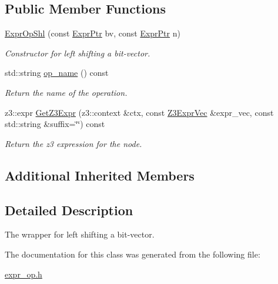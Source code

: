 \subsection*{Public Member Functions}
\begin{DoxyCompactItemize}
\item 
\mbox{\label{classilang_1_1_expr_op_shl_a85a0e2552bc2f503a9d3c6f4aadc6f0b}} 
\mbox{\hyperlink{classilang_1_1_expr_op_shl_a85a0e2552bc2f503a9d3c6f4aadc6f0b}{Expr\+Op\+Shl}} (const \mbox{\hyperlink{classilang_1_1_expr_a85952b6a34620c4c8cab6bac9c9fdf8c}{Expr\+Ptr}} bv, const \mbox{\hyperlink{classilang_1_1_expr_a85952b6a34620c4c8cab6bac9c9fdf8c}{Expr\+Ptr}} n)
\begin{DoxyCompactList}\small\item\em Constructor for left shifting a bit-\/vector. \end{DoxyCompactList}\item 
\mbox{\label{classilang_1_1_expr_op_shl_a8ddad9339c3165439b415035906368b8}} 
std\+::string \mbox{\hyperlink{classilang_1_1_expr_op_shl_a8ddad9339c3165439b415035906368b8}{op\+\_\+name}} () const
\begin{DoxyCompactList}\small\item\em Return the name of the operation. \end{DoxyCompactList}\item 
\mbox{\label{classilang_1_1_expr_op_shl_a297b2bc3b268ad05f31992154c806c72}} 
z3\+::expr \mbox{\hyperlink{classilang_1_1_expr_op_shl_a297b2bc3b268ad05f31992154c806c72}{Get\+Z3\+Expr}} (z3\+::context \&ctx, const \mbox{\hyperlink{namespaceilang_adc4eee919aa24fff882d03a48d733c19}{Z3\+Expr\+Vec}} \&expr\+\_\+vec, const std\+::string \&suffix=\char`\"{}\char`\"{}) const
\begin{DoxyCompactList}\small\item\em Return the z3 expression for the node. \end{DoxyCompactList}\end{DoxyCompactItemize}
\subsection*{Additional Inherited Members}


\subsection{Detailed Description}
The wrapper for left shifting a bit-\/vector. 

The documentation for this class was generated from the following file\+:\begin{DoxyCompactItemize}
\item 
\mbox{\hyperlink{expr__op_8h}{expr\+\_\+op.\+h}}\end{DoxyCompactItemize}
